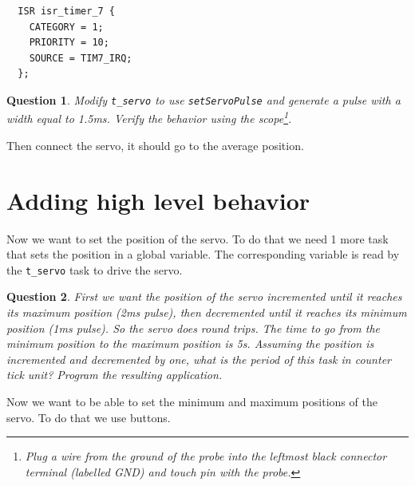 \documentclass[11pt]{report}
\newtheorem{ex}{Question}
\begin{document}
\begin{lstlisting}
  ISR isr_timer_7 {
    CATEGORY = 1;
    PRIORITY = 10;
    SOURCE = TIM7_IRQ;
  };
\end{lstlisting}

\begin{ex}
Modify \texttt{t_servo} to use \texttt{setServoPulse} and generate a pulse with a width  equal to 1.5ms. Verify the behavior using the scope\footnote{Plug a wire from the ground of the probe into the leftmost black connector terminal (labelled GND) and touch  pin with the probe.}.
\end{ex}

Then connect the servo, it should go to the average position.

\section{Adding high level behavior}

Now we want to set the position of the servo. To do that we need 1 more task that sets the position in a global variable. The corresponding variable is read by the \texttt{t_servo} task to drive the servo.

\begin{ex}
First we want the position of the servo incremented until it reaches its maximum
position (2ms pulse), then decremented until it reaches its minimum position
(1ms pulse). So the servo does round trips. The time to go from the
minimum position to the maximum position is 5s. Assuming the position is
incremented and decremented by one, what is the period of this task in
counter tick unit?
Program the resulting application.
\end{ex}

Now we want to be able to set the minimum and maximum positions of the servo. To do that we use buttons.
\end{document}
